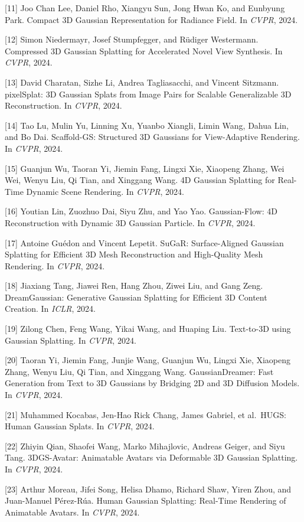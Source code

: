 {[}11{]} Joo Chan Lee, Daniel Rho, Xiangyu Sun, Jong Hwan Ko, and Eunbyung Park. Compact 3D Gaussian Representation for Radiance Field. In \emph{CVPR}, 2024.

{[}12{]} Simon Niedermayr, Josef Stumpfegger, and Rüdiger Westermann. Compressed 3D Gaussian Splatting for Accelerated Novel View Synthesis. In \emph{CVPR}, 2024.

{[}13{]} David Charatan, Sizhe Li, Andrea Tagliasacchi, and Vincent Sitzmann. pixelSplat: 3D Gaussian Splats from Image Pairs for Scalable Generalizable 3D Reconstruction. In \emph{CVPR}, 2024.

{[}14{]} Tao Lu, Mulin Yu, Linning Xu, Yuanbo Xiangli, Limin Wang, Dahua Lin, and Bo Dai. Scaffold-GS: Structured 3D Gaussians for View-Adaptive Rendering. In \emph{CVPR}, 2024.

{[}15{]} Guanjun Wu, Taoran Yi, Jiemin Fang, Lingxi Xie, Xiaopeng Zhang, Wei Wei, Wenyu Liu, Qi Tian, and Xinggang Wang. 4D Gaussian Splatting for Real-Time Dynamic Scene Rendering. In \emph{CVPR}, 2024.

{[}16{]} Youtian Lin, Zuozhuo Dai, Siyu Zhu, and Yao Yao. Gaussian-Flow: 4D Reconstruction with Dynamic 3D Gaussian Particle. In \emph{CVPR}, 2024.

{[}17{]} Antoine Guédon and Vincent Lepetit. SuGaR: Surface-Aligned Gaussian Splatting for Efficient 3D Mesh Reconstruction and High-Quality Mesh Rendering. In \emph{CVPR}, 2024.

{[}18{]} Jiaxiang Tang, Jiawei Ren, Hang Zhou, Ziwei Liu, and Gang Zeng. DreamGaussian: Generative Gaussian Splatting for Efficient 3D Content Creation. In \emph{ICLR}, 2024.

{[}19{]} Zilong Chen, Feng Wang, Yikai Wang, and Huaping Liu. Text-to-3D using Gaussian Splatting. In \emph{CVPR}, 2024.

{[}20{]} Taoran Yi, Jiemin Fang, Junjie Wang, Guanjun Wu, Lingxi Xie, Xiaopeng Zhang, Wenyu Liu, Qi Tian, and Xinggang Wang. GaussianDreamer: Fast Generation from Text to 3D Gaussians by Bridging 2D and 3D Diffusion Models. In \emph{CVPR}, 2024.

{[}21{]} Muhammed Kocabas, Jen-Hao Rick Chang, James Gabriel, et al.~HUGS: Human Gaussian Splats. In \emph{CVPR}, 2024.

{[}22{]} Zhiyin Qian, Shaofei Wang, Marko Mihajlovic, Andreas Geiger, and Siyu Tang. 3DGS-Avatar: Animatable Avatars via Deformable 3D Gaussian Splatting. In \emph{CVPR}, 2024.

{[}23{]} Arthur Moreau, Jifei Song, Helisa Dhamo, Richard Shaw, Yiren Zhou, and Juan-Manuel Pérez-Rúa. Human Gaussian Splatting: Real-Time Rendering of Animatable Avatars. In \emph{CVPR}, 2024.


